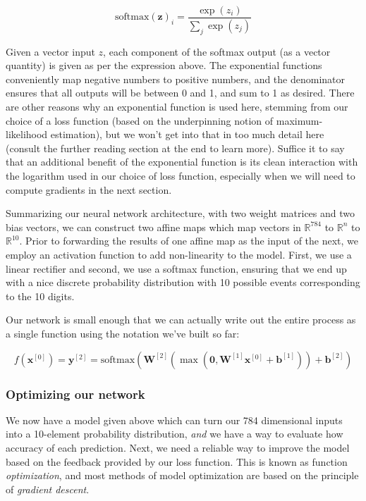 \documentclass[
]{article}
\begin{document}
\[\mathrm{softmax}(\mathbf{z})_i = \frac{\exp(z_i)}{\sum_j \exp(z_j)}\]

Given a vector input \(z\), each component of the softmax output (as a
vector quantity) is given as per the expression above. The exponential
functions conveniently map negative numbers to positive numbers, and the
denominator ensures that all outputs will be between 0 and 1, and sum to
1 as desired. There are other reasons why an exponential function is
used here, stemming from our choice of a loss function (based on the
underpinning notion of maximum-likelihood estimation), but we won't get
into that in too much detail here (consult the further reading section
at the end to learn more). Suffice it to say that an additional benefit
of the exponential function is its clean interaction with the logarithm
used in our choice of loss function, especially when we will need to
compute gradients in the next section.

Summarizing our neural network architecture, with two weight matrices
and two bias vectors, we can construct two affine maps which map vectors
in \(\mathbb{R}^{784}\) to \(\mathbb{R}^n\) to \(\mathbb{R}^{10}\).
Prior to forwarding the results of one affine map as the input of the
next, we employ an activation function to add non-linearity to the
model. First, we use a linear rectifier and second, we use a softmax
function, ensuring that we end up with a nice discrete probability
distribution with 10 possible events corresponding to the 10 digits.

Our network is small enough that we can actually write out the entire
process as a single function using the notation we've built so far:

\[f(\mathbf{x}^{[0]}) = \mathbf{y}^{[2]} = \mathrm{softmax}\left(\mathbf{W}^{[2]}\left(\max\left(\mathbf{0}, \mathbf{W}^{[1]}\mathbf{x}^{[0]} + \mathbf{b}^{[1]}\right) \right) + \mathbf{b}^{[2]} \right)\]

\hypertarget{optimizing-our-network}{%
\subsubsection{Optimizing our network}\label{optimizing-our-network}}

We now have a model given above which can turn our 784 dimensional
inputs into a 10-element probability distribution, \emph{and} we have a
way to evaluate how accuracy of each prediction. Next, we need a
reliable way to improve the model based on the feedback provided by our
loss function. This is known as function \emph{optimization}, and most
methods of model optimization are based on the principle of
\emph{gradient descent}.
\end{document}

